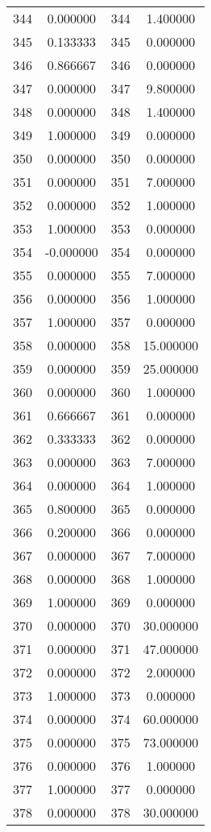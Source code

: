 \documentclass[12pt]{article}
\begin{document}
\begin{longtable}{@{}cccc@{}}
344 & 0.000000 & 344 & 1.400000 \\
345 & 0.133333 & 345 & 0.000000 \\
346 & 0.866667 & 346 & 0.000000 \\
347 & 0.000000 & 347 & 9.800000 \\
348 & 0.000000 & 348 & 1.400000 \\
349 & 1.000000 & 349 & 0.000000 \\
350 & 0.000000 & 350 & 0.000000 \\
351 & 0.000000 & 351 & 7.000000 \\
352 & 0.000000 & 352 & 1.000000 \\
353 & 1.000000 & 353 & 0.000000 \\
354 & -0.000000 & 354 & 0.000000 \\
355 & 0.000000 & 355 & 7.000000 \\
356 & 0.000000 & 356 & 1.000000 \\
357 & 1.000000 & 357 & 0.000000 \\
358 & 0.000000 & 358 & 15.000000 \\
359 & 0.000000 & 359 & 25.000000 \\
360 & 0.000000 & 360 & 1.000000 \\
361 & 0.666667 & 361 & 0.000000 \\
362 & 0.333333 & 362 & 0.000000 \\
363 & 0.000000 & 363 & 7.000000 \\
364 & 0.000000 & 364 & 1.000000 \\
365 & 0.800000 & 365 & 0.000000 \\
366 & 0.200000 & 366 & 0.000000 \\
367 & 0.000000 & 367 & 7.000000 \\
368 & 0.000000 & 368 & 1.000000 \\
369 & 1.000000 & 369 & 0.000000 \\
370 & 0.000000 & 370 & 30.000000 \\
371 & 0.000000 & 371 & 47.000000 \\
372 & 0.000000 & 372 & 2.000000 \\
373 & 1.000000 & 373 & 0.000000 \\
374 & 0.000000 & 374 & 60.000000 \\
375 & 0.000000 & 375 & 73.000000 \\
376 & 0.000000 & 376 & 1.000000 \\
377 & 1.000000 & 377 & 0.000000 \\
378 & 0.000000 & 378 & 30.000000 \\

\end{longtable}
\end{document}
